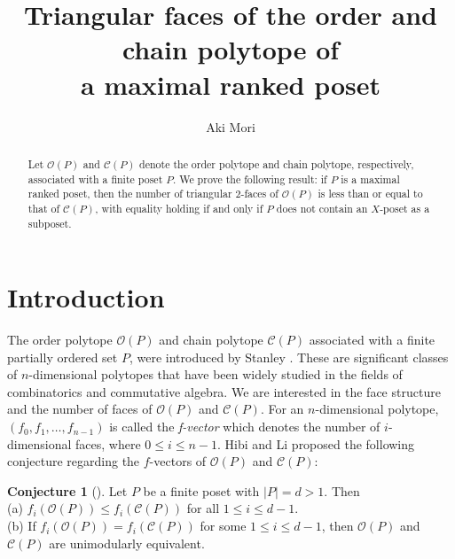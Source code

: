 \documentclass[12pt]{amsart}
\def\Oc{{\mathcal O}}
\def\Cc{{\mathcal C}}
\theoremstyle{definition}
\newtheorem{Conjecture}[Theorem]{Conjecture}
\begin{document}
\title{Triangular faces of the order and chain polytope of\\
a maximal ranked poset}

\author{Aki Mori}

\address{Aki Mori,
	Learning center, Institute for general education, Setsunan University, Neyagawa, Osaka, 572-8508, Japan} 



\begin{abstract}
Let $\Oc(P)$ and $\Cc(P)$ denote the order polytope and chain polytope, respectively, associated with a finite poset $P$. We prove the following result: if $P$ is a maximal ranked poset, then the number of triangular $2$-faces of $\Oc(P)$ is less than or equal to that of $\Cc(P)$, with equality holding if and only if $P$ does not contain an $X$-poset as a subposet.
\end{abstract}

\maketitle
\section{Introduction}
The order polytope $\Oc(P)$ and chain polytope $\Cc(P)$ associated with a finite partially ordered set $P$, were introduced by Stanley \cite{Sta}.
These are significant classes of $n$-dimensional polytopes that have been widely studied in the fields of combinatorics and commutative algebra.
We are interested in the face structure and the number of faces of $\Oc(P)$ and $\Cc(P)$.
For an $n$-dimensional polytope, $(f_0, f_1, \ldots, f_{n-1})$ is called the {\it f-vector} which denotes the number of $i$-dimensional faces, where $0 \leq i \leq n-1$.
Hibi and Li proposed the following conjecture regarding the $f$-vectors of $\Oc(P)$ and $\Cc(P)$:


\begin{Conjecture}[{\cite[Conjecture 2.4]{HL2}}]\label{HL-conj}
Let $P$ be a finite poset with $|P| = d > 1$. 
Then\\
(a)  $f_i(\Oc(P)) \leq f_i(\Cc(P))$ for all $1 \leq i \leq d-1$.\\
(b)  If $f_i(\Oc(P)) = f_i(\Cc(P))$ for some $1 \leq i \leq d-1$, then $\Oc(P)$ and $\Cc(P)$ are unimodularly equivalent.    
\end{Conjecture}
\end{document}
